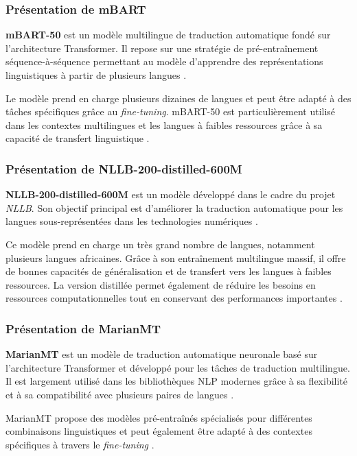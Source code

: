 \subsubsection{Présentation de \ac{mBART}}

\textbf{mBART-50} est un modèle multilingue de traduction automatique fondé sur l'architecture Transformer. Il repose sur une stratégie de pré-entraînement séquence-à-séquence permettant au modèle d'apprendre des représentations linguistiques à partir de plusieurs langues \cite{rakhimov2024enhancing}.

Le modèle prend en charge plusieurs dizaines de langues et peut être adapté à des tâches spécifiques grâce au \textit{fine-tuning}. mBART-50 est particulièrement utilisé dans les contextes multilingues et les langues à faibles ressources grâce à sa capacité de transfert linguistique \cite{rakhimov2024enhancing}.

\subsubsection{Présentation de NLLB-200-distilled-600M}

\textbf{NLLB-200-distilled-600M} est un modèle développé dans le cadre du projet \textit{\ac{NLLB}}. Son objectif principal est d'améliorer la traduction automatique pour les langues sous-représentées dans les technologies numériques \cite{ranathunga2023neural}.

Ce modèle prend en charge un très grand nombre de langues, notamment plusieurs langues africaines. Grâce à son entraînement multilingue massif, il offre de bonnes capacités de généralisation et de transfert vers les langues à faibles ressources. La version distillée permet également de réduire les besoins en ressources computationnelles tout en conservant des performances importantes \cite{agyei2025dynamic}.

\subsubsection{Présentation de \ac{MarianMT}}

\textbf{\ac{MarianMT}} est un modèle de traduction automatique neuronale basé sur l'architecture Transformer et développé pour les tâches de traduction multilingue. Il est largement utilisé dans les bibliothèques \ac{NLP} modernes grâce à sa flexibilité et à sa compatibilité avec plusieurs paires de langues \cite{angel2023comparing}.

MarianMT propose des modèles pré-entraînés spécialisés pour différentes combinaisons linguistiques et peut également être adapté à des contextes spécifiques à travers le \textit{fine-tuning} \cite{lalrempuii2023investigating}.


